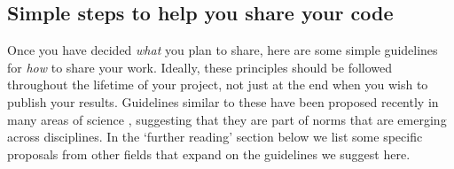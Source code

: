 \documentclass[11pt]{article}
\begin{document}
\subsection*{Simple steps to help you share your code}

Once you have decided \textit{what} you plan to share, here are some simple 
guidelines for \textit{how} to share your work.  Ideally, these
principles should be followed throughout the lifetime of your project,
not just at the end when you wish to publish your results. Guidelines similar to these have been proposed recently in many areas of science \cite{Nosek2015, miguel2014, stodden2012journals}, suggesting that they are part of norms that are emerging across disciplines. In the `further reading' section below we list some specific proposals from other fields that expand on the guidelines we suggest here.  
\end{document}
